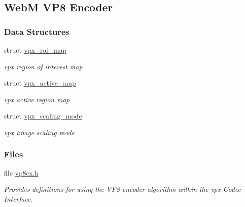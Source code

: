 \hypertarget{group__vp8__encoder}{
\subsection{\-Web\-M \-V\-P8 \-Encoder}
\label{group__vp8__encoder}
}
\subsubsection*{\-Data \-Structures}
\begin{DoxyCompactItemize}
\item 
struct \hyperlink{structvpx__roi__map}{vpx\-\_\-roi\-\_\-map}
\begin{DoxyCompactList}\small\item\em vpx region of interest map \end{DoxyCompactList}\item 
struct \hyperlink{structvpx__active__map}{vpx\-\_\-active\-\_\-map}
\begin{DoxyCompactList}\small\item\em vpx active region map \end{DoxyCompactList}\item 
struct \hyperlink{structvpx__scaling__mode}{vpx\-\_\-scaling\-\_\-mode}
\begin{DoxyCompactList}\small\item\em vpx image scaling mode \end{DoxyCompactList}\end{DoxyCompactItemize}
\subsubsection*{\-Files}
\begin{DoxyCompactItemize}
\item 
file \hyperlink{vp8cx_8h}{vp8cx.\-h}
\begin{DoxyCompactList}\small\item\em \-Provides definitions for using the \-V\-P8 encoder algorithm within the vpx \-Codec \-Interface. \end{DoxyCompactList}\end{DoxyCompactItemize}
